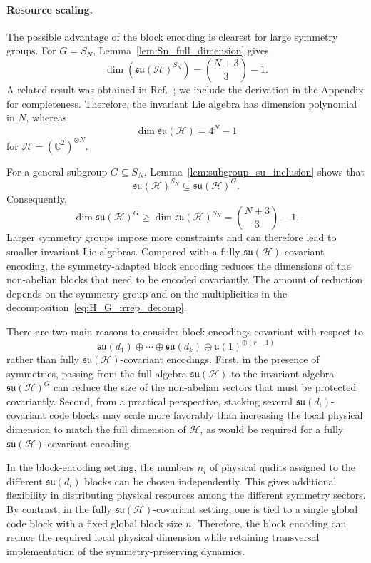 \documentclass[10pt,twocolumn,superscriptaddress,aps,amsmath,amssymb,citeautoscript,floatfix,prx]{revtex4-2}
\newcounter{alg}
\theoremstyle{plain}
\theoremstyle{plain}
\theoremstyle{plain}
\theoremstyle{plain}
\theoremstyle{plain}
\theoremstyle{plain}
\theoremstyle{plain}
\theoremstyle{definition}
\theoremstyle{plain}
\begin{document}
\paragraph{Resource scaling.}

The possible advantage of the block encoding is clearest for large symmetry groups. For $G=S_N$, Lemma~\ref{lem:Sn_full_dimension} gives
$$
\dim\left(\mathfrak{su}(\mathcal H)^{S_N}\right)
=
\binom{N+3}{3}
-
1 .
$$
A related result was obtained in Ref.~\cite{Albertini2018}; we include the derivation in the Appendix for completeness. 
Therefore, the invariant Lie algebra has dimension polynomial in $N$, whereas
$$
\dim\mathfrak{su}(\mathcal H)
=
4^N-1
$$
for $\mathcal H=(\mathbb C^2)^{\otimes N}$.

For a general subgroup $G\subseteq S_N$, Lemma~\ref{lem:subgroup_su_inclusion} shows that
$$
\mathfrak{su}(\mathcal H)^{S_N}
\subseteq
\mathfrak{su}(\mathcal H)^G .
$$
Consequently,
\begin{equation}\label{eq:inv_alg_dim}
\dim\mathfrak{su}(\mathcal H)^G
\ge
\dim\mathfrak{su}(\mathcal H)^{S_N}
=
\binom{N+3}{3}
-
1 .
\end{equation}
Larger symmetry groups impose more constraints and can therefore lead to smaller invariant Lie algebras. 
Compared with a fully $\mathfrak{su}(\mathcal H)$-covariant encoding, the symmetry-adapted block encoding reduces the dimensions of the non-abelian blocks 
that need to be encoded covariantly. The amount of reduction depends on the symmetry group and on the multiplicities in the decomposition~\eqref{eq:H_G_irrep_decomp}.

There are two main reasons to consider block encodings covariant with respect to
$$
\mathfrak{su}(d_1)
\oplus
\cdots
\oplus
\mathfrak{su}(d_k)
\oplus
\mathfrak{u}(1)^{\oplus(r-1)}
$$
rather than fully $\mathfrak{su}(\mathcal H)$-covariant encodings. First, in the presence of symmetries, passing from the full algebra $\mathfrak{su}(\mathcal H)$ to the invariant algebra 
$\mathfrak{su}(\mathcal H)^G$ can reduce the size of the non-abelian sectors that must be protected covariantly. 
Second, from a practical perspective, stacking several $\mathfrak{su}(d_i)$-covariant code blocks may scale more favorably than increasing 
the local physical dimension to match the full dimension of $\mathcal H$, as would be required for a fully $\mathfrak{su}(\mathcal H)$-covariant encoding.

In the block-encoding setting, the numbers $n_i$ of physical qudits assigned to the different $\mathfrak{su}(d_i)$ blocks can be chosen independently. 
This gives additional flexibility in distributing physical resources among the different symmetry sectors. 
By contrast, in the fully $\mathfrak{su}(\mathcal H)$-covariant setting, one is tied to a single global code block with a fixed global block size $n$. 
Therefore, the block encoding can reduce the required local physical dimension while retaining transversal implementation of the symmetry-preserving dynamics.
\end{document}

